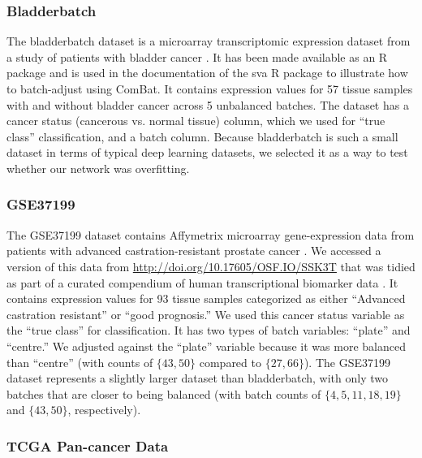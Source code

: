 \documentclass[notitlepage]{article}
\begin{document}
\subsubsection{Bladderbatch}

The bladderbatch dataset is a microarray transcriptomic expression dataset from a study of patients with bladder cancer \cite{dyrskjot_gene_2004}.
It has been made available as an R package \cite{leek_bladderbatch_2017} and is used in the documentation of the sva R package \cite{leek_sva_2017} to illustrate how to batch-adjust using ComBat.
It contains expression values for 57 tissue samples with and without bladder cancer across 5 unbalanced batches.
The dataset has a cancer status (cancerous vs. normal tissue) column, which we used for ``true class'' classification, and a batch column.
Because bladderbatch is such a small dataset in terms of typical deep learning datasets, we selected it as a way to test whether our network was overfitting.

\subsubsection{GSE37199}

The GSE37199 dataset contains Affymetrix microarray gene-expression data from patients with advanced castration-resistant prostate cancer \cite{olmos_prognostic_2012}.
We accessed a version of this data from \url{http://doi.org/10.17605/OSF.IO/SSK3T} that was tidied as part of a curated compendium of human transcriptional biomarker data \cite{golightly_curated_2018}.
It contains expression values for 93 tissue samples categorized as either ``Advanced castration resistant'' or ``good prognosis.''
We used this cancer status variable as the ``true class'' for classification.
It has two types of batch variables: ``plate'' and ``centre.''
We adjusted against the ``plate'' variable because it was more balanced than ``centre'' (with counts of $\{43, 50\}$ compared to $\{27, 66\}$).
The GSE37199 dataset represents a slightly larger dataset than bladderbatch, with only two batches that are closer to being balanced (with batch counts of $\{4, 5, 11, 18, 19\}$ and $\{43, 50\}$, respectively).

\subsubsection{TCGA Pan-cancer Data}
\end{document}
